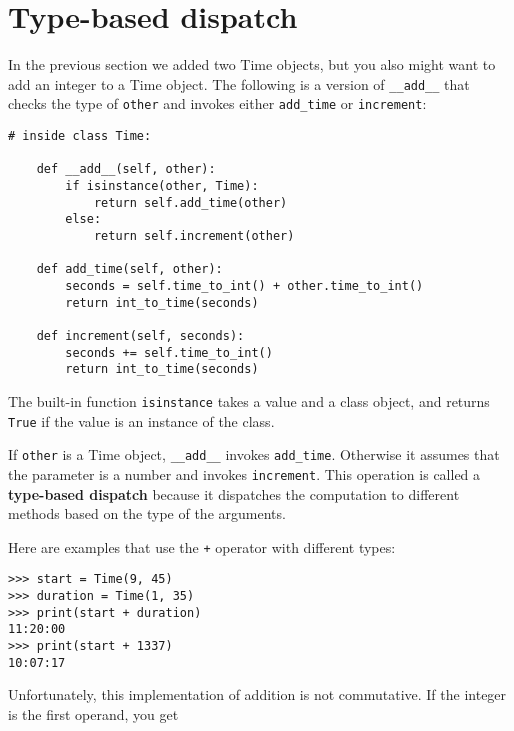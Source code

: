 \section{Type-based dispatch}

In the previous section we added two Time objects, but you
also might want to add an integer to a Time object.  The
following is a version of \verb"__add__"
that checks the type of {\tt other} and invokes either
\verb"add_time" or {\tt increment}:

\begin{lstlisting}
# inside class Time:

    def __add__(self, other):
        if isinstance(other, Time):
            return self.add_time(other)
        else:
            return self.increment(other)

    def add_time(self, other):
        seconds = self.time_to_int() + other.time_to_int()
        return int_to_time(seconds)

    def increment(self, seconds):
        seconds += self.time_to_int()
        return int_to_time(seconds)
\end{lstlisting}

%
The built-in function {\tt isinstance} takes a value and a
class object, and returns {\tt True} if the value is an instance
of the class.

If {\tt other} is a Time object, \verb"__add__" invokes
\verb"add_time".  Otherwise it assumes that the parameter
is a number and invokes {\tt increment}.  This operation is
called a {\bf type-based dispatch} because it dispatches the
computation to different methods based on the type of the
arguments.

Here are examples that use the {\tt +} operator with different
types:

\begin{lstlisting}
>>> start = Time(9, 45)
>>> duration = Time(1, 35)
>>> print(start + duration)
11:20:00
>>> print(start + 1337)
10:07:17
\end{lstlisting}

%
Unfortunately, this implementation of addition is not commutative.
If the integer is the first operand, you get

